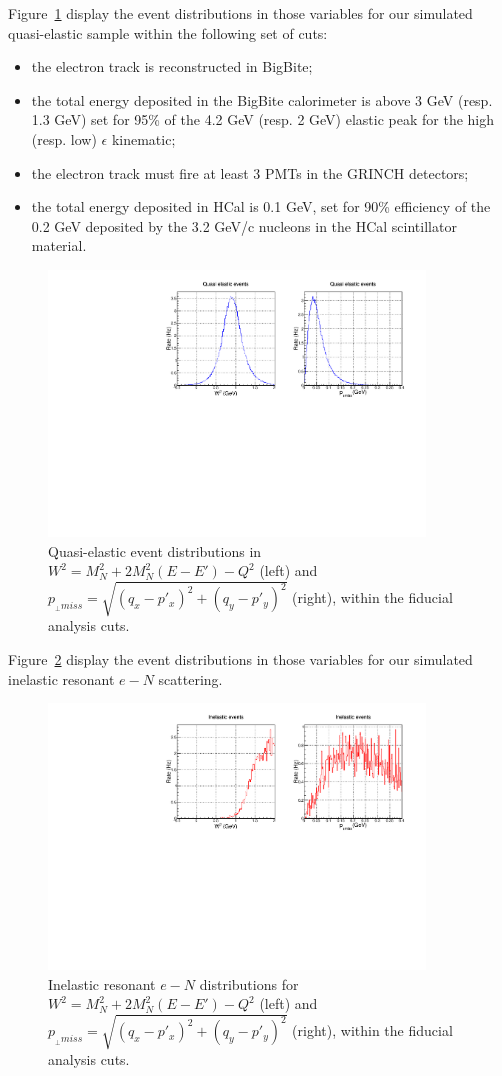 \documentclass[11pt]{article}
\begin{document}

Figure~\ref{fig:qe} display the event distributions in those variables for our simulated quasi-elastic sample within the following set of cuts:
%
\begin{itemize}
\item{the electron track is reconstructed in BigBite;}
\item{the total energy deposited in the BigBite calorimeter is above 3 GeV (resp. 1.3 GeV) set for 95\% of the 4.2 GeV (resp. 2 GeV) elastic peak for the high (resp. low) $\epsilon$ kinematic;}
\item{the electron track must fire at least 3 PMTs in the GRINCH detectors;}
\item{the total energy deposited in HCal is 0.1 GeV, set for 90\% efficiency of the 0.2 GeV deposited by the 3.2 GeV/c nucleons in the HCal scintillator material.}
\end{itemize}
%
\begin{figure}[h]
  \centering
    \includegraphics[width=10cm]{W2_pperp_sig.pdf}
    \caption{Quasi-elastic event distributions in $W^2 = M_{N}^2+2M_{N}^{2}(E-E')-Q^2$ (left) and $p_{_{\perp} miss} = \sqrt{(q_{x}-p'_{x})^2+(q_{y}-p'_{y})^2}$ (right), within the fiducial analysis cuts.}
    \label{fig:qe}
\end{figure}
%
Figure~\ref{fig:inel} display the event distributions in those variables for our simulated inelastic resonant $e-N$ scattering.
%
\begin{figure}[!h]
  \centering
    \includegraphics[width=10cm]{W2_pperp_inel.pdf}
    \caption{Inelastic resonant $e-N$ distributions for $W^2 = M_{N}^2+2M_{N}^{2}(E-E')-Q^2$ (left) and $p_{_{\perp} miss} = \sqrt{(q_{x}-p'_{x})^2+(q_{y}-p'_{y})^2}$ (right), within the fiducial analysis cuts.}
    \label{fig:inel}
\end{figure}
\end{document}
